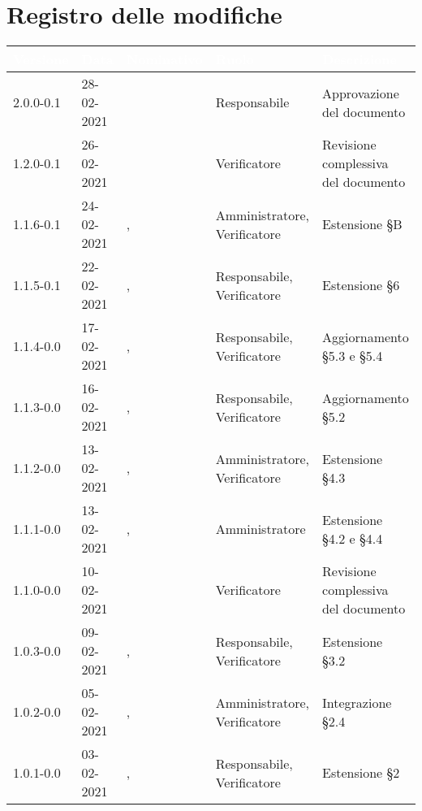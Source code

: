 \section*{Registro delle modifiche}
{
\setcounter{table}{-1}
{
\renewcommand{\arraystretch}{1.5}
\centering
\begin{longtable}{C{1.7cm} C{2.5cm} C{3.2cm} C{2.7cm} C{4.8cm}}
\textcolor{white}{\textbf{Versione}}&
\textcolor{white}{\textbf{Data}}&
\textcolor{white}{\textbf{Nominativo}}&
\textcolor{white}{\textbf{Ruolo}}&
\textcolor{white}{\textbf{Descrizione}}\\	
\endhead

2.0.0-0.1 & 28-02-2021 & \ZM{} & Responsabile & Approvazione del documento\\

1.2.0-0.1 & 26-02-2021 & \SP{} & Verificatore & Revisione complessiva del documento\\

1.1.6-0.1 & 24-02-2021 & \SG{}, \SP{} & Amministratore, Verificatore & Estensione \S B\\

1.1.5-0.1 & 22-02-2021 & \ZM{}, \SP{} & Responsabile, Verificatore & Estensione \S 6\\

1.1.4-0.0 & 17-02-2021 & \PA{}, \ZM{} & Responsabile, Verificatore & Aggiornamento \S 5.3 e \S 5.4\\

1.1.3-0.0 & 16-02-2021 & \PA{}, \ZM{} & Responsabile, Verificatore & Aggiornamento \S 5.2\\

1.1.2-0.0 & 13-02-2021 & \BM{}, \ZM{} & Amministratore, Verificatore & Estensione \S 4.3\\

1.1.1-0.0 & 13-02-2021 & \SG{}, \ZM{} & Amministratore & Estensione \S 4.2 e \S 4.4\\

1.1.0-0.0 & 10-02-2021 & \ZM{} & Verificatore & Revisione complessiva del documento\\

1.0.3-0.0 & 09-02-2021 & \PA{}, \SP{} & Responsabile, Verificatore & Estensione \S 3.2\\

1.0.2-0.0 & 05-02-2021& \BM{}, \SP{} & Amministratore, Verificatore & Integrazione \S 2.4\\

1.0.1-0.0 & 03-02-2021 & \PA{}, \SP{} & Responsabile, Verificatore & Estensione \S 2\\


\end{longtable}}}

